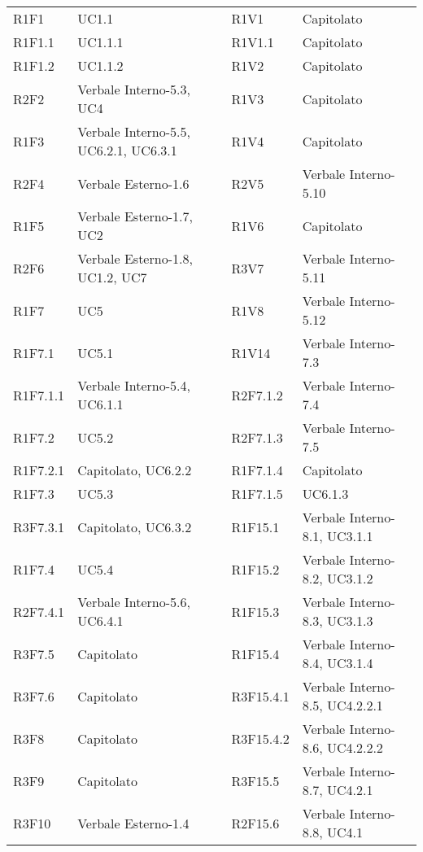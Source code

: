\begin{center}
\begin{longtable}{C{2cm} | C{5cm} C{0.2cm} C{2cm} | C{5cm}}
R1F1 & UC1.1 &  & R1V1 & Capitolato \\
R1F1.1 & UC1.1.1 &  & R1V1.1 & Capitolato \\
R1F1.2 & UC1.1.2 &  & R1V2 & Capitolato  \\
R2F2 & Verbale Interno-5.3, UC4 &  & R1V3 & Capitolato  \\
R1F3 & Verbale Interno-5.5, UC6.2.1, UC6.3.1 &  & R1V4 & Capitolato\\
R2F4 & Verbale Esterno-1.6 &  & R2V5 & Verbale Interno-5.10  \\
R1F5 & Verbale Esterno-1.7, UC2 &  & R1V6 & Capitolato \\
R2F6 & Verbale Esterno-1.8, UC1.2, UC7 &  & R3V7 & Verbale Interno-5.11  \\
R1F7 & UC5 &  & R1V8 & Verbale Interno-5.12  \\
R1F7.1 & UC5.1 &  & R1V14 & Verbale Interno-7.3\\
R1F7.1.1 & Verbale Interno-5.4, UC6.1.1 &  & R2F7.1.2 & Verbale Interno-7.4 \\
R1F7.2 & UC5.2 &  & R2F7.1.3 & Verbale Interno-7.5 \\
R1F7.2.1 & Capitolato, UC6.2.2 &  & R1F7.1.4  & Capitolato \\
R1F7.3 & UC5.3 &  & R1F7.1.5 & UC6.1.3 \\
R3F7.3.1 & Capitolato, UC6.3.2 &  & R1F15.1  & Verbale Interno-8.1, UC3.1.1 \\
R1F7.4 & UC5.4 &  & R1F15.2 & Verbale Interno-8.2, UC3.1.2 \\
R2F7.4.1 & Verbale Interno-5.6, UC6.4.1 &  & R1F15.3 & Verbale Interno-8.3, UC3.1.3 \\
R3F7.5 & Capitolato &  & R1F15.4 & Verbale Interno-8.4, UC3.1.4 \\
R3F7.6 & Capitolato &  & R3F15.4.1 & Verbale Interno-8.5, UC4.2.2.1 \\
R3F8 & Capitolato &  & R3F15.4.2 & Verbale Interno-8.6, UC4.2.2.2 \\
R3F9 & Capitolato &  & R3F15.5 & Verbale Interno-8.7, UC4.2.1 \\
R3F10 & Verbale Esterno-1.4 &  & R2F15.6 & Verbale Interno-8.8, UC4.1 \\

\end{longtable}
\end{center}
